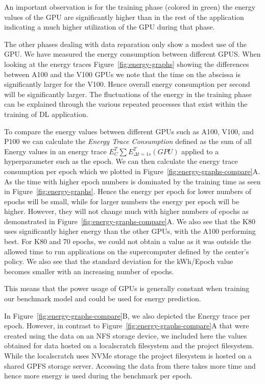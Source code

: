 \documentclass[utf8]{FrontiersinVancouver} %
\newcommand{\TODO}[2]{\todo[inline]{{\bf \color{red} #1} #2}}
\begin{document}
An important observation is for the training phase (colored in green) the energy values of the GPU are significantly higher than in the rest of the application indicating a much higher utilization of the GPU during that phase.

The other phases dealing with data reparation only show a modest use of the GPU. We have measured the energy consumption between different GPUS.  When looking at the energy traces Figure~\ref{fig:energy-graphs} showing the differences between A100 and the V100 GPUs we note that the time on the abscissa is significantly larger for the V100. Hence overall energy consumption per second will be significantly larger. The fluctuations of the energy in the training phase can be explained through the various repeated processes that exist within the training of DL application.


To compare the energy values between different GPUs such as A100, V100, and P100 we can calculate the {\em Energy Trace Consumption} defined as the sum of all Energy values in an energy trace $E^T_C \sum E^T_{\Delta t=1s}(GPU)$ applied to a hyperparameter such as the epoch.  We can then calculate the energy trace consumption per epoch which we plotted in Figure~\ref{fig:energy-graphs-compare}A.  As the time with higher epoch numbers is dominated by the training time as seen in Figure~\ref{fig:energy-graphs}.  Hence the energy per epoch for lower numbers of epochs will be small, while for larger numbers the energy per epoch will be higher. However, they will not change much with higher numbers of epochs as demonstrated in Figure~\ref{fig:energy-graphs-compare}A.  We also see that the K80 uses significantly higher energy than the other GPUs, with the A100 performing best. For K80 and 70 epochs, we could not obtain a value as it was outside the allowed time to run applications on the supercomputer defined by the center's policy.  We also see that the standard deviation for the kWh/Epoch value becomes smaller with an increasing number of epochs.

This means that the power usage of GPUs is generally constant when training our benchmark model and could be used for energy prediction.



In Figure~\ref{fig:energy-graphs-compare}B, we also depicted the Energy trace per epoch. However, in contrast to Figure~\ref{fig:energy-graphs-compare}A that were created using the data on an NFS storage device, we included here the values obtained for data hosted on a localscratch filesystem and the project filesystem. While the localscratch uses NVMe storage the project filesystem is hosted on a shared GPFS storage server. Accessing the data from there takes more time and hence more energy is used during the benchmark per epoch.
\end{document}
